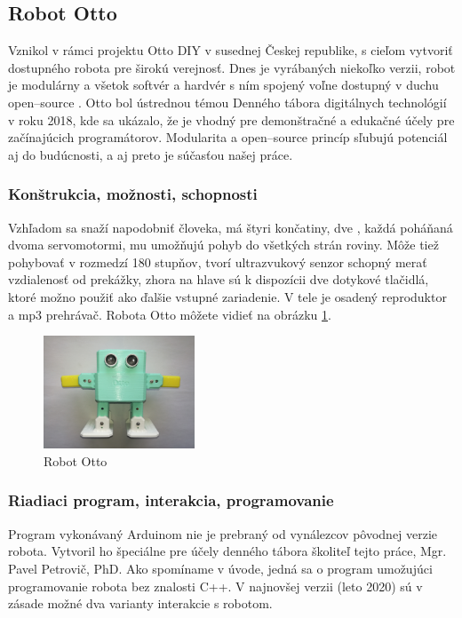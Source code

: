 \subsection{Robot Otto}
Vznikol v rámci projektu Otto DIY v susednej Českej republike, s cieľom vytvoriť dostupného robota pre širokú verejnosť. Dnes je vyrábaných niekoľko verzii, robot je modulárny a všetok softvér a hardvér s ním spojený voľne dostupný v duchu open--source \cite{OttoDIY}. Otto bol ústrednou témou Denného tábora digitálnych technológií v roku 2018, kde sa ukázalo, že je vhodný pre demonštračné a edukačné účely pre začínajúcich programátorov. Modularita a open--source princíp sľubujú potenciál aj do budúcnosti, a aj preto je súčasťou našej práce.

\subsubsection{Konštrukcia, možnosti, schopnosti}
Vzhľadom sa snaží napodobniť človeka, má štyri končatiny, dve , každá poháňaná dvoma servomotormi, mu umožňujú pohyb do všetkých strán roviny. Môže tiež pohybovať  v rozmedzí 180 stupňov,  tvorí ultrazvukový senzor schopný merať vzdialenosť od prekážky, zhora na hlave sú k dispozícii dve dotykové tlačidlá, ktoré možno použiť ako ďalšie vstupné zariadenie. V tele je osadený reproduktor a mp3 prehrávač. Robota Otto môžete vidieť na obrázku \ref{obr:otto}.

\begin{figure}
\centerline{\includegraphics[width=0.4\textwidth]{images/otto}}
\caption[Robot Otto]{Robot Otto}
\label{obr:otto}
\end{figure}

\subsubsection{Riadiaci program, interakcia, programovanie}
Program vykonávaný Arduinom nie je prebraný od vynálezcov pôvodnej verzie robota. Vytvoril ho špeciálne pre účely denného tábora školiteľ tejto práce, Mgr. Pavel Petrovič, PhD. Ako spomíname v úvode, jedná sa o program umožujúci programovanie robota bez znalosti C++. V najnovšej verzii (leto 2020) sú v zásade možné dva varianty interakcie s robotom.

